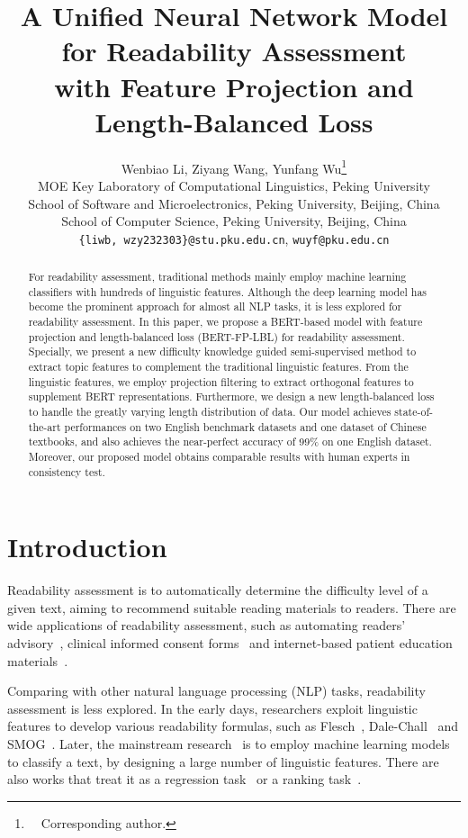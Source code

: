 \documentclass[11pt]{article}
\title{A Unified Neural Network Model for Readability Assessment \\
with Feature Projection and Length-Balanced Loss}
\author{Wenbiao Li,
        Ziyang Wang, 
        Yunfang Wu\thanks{~~Corresponding author.} \\
    MOE Key Laboratory of Computational Linguistics, Peking University \\ 
    School of Software and Microelectronics, Peking University, Beijing, China \\
    School of Computer Science, Peking University, Beijing, China \\
    \texttt{\{liwb, wzy232303\}@stu.pku.edu.cn},
    \texttt{wuyf@pku.edu.cn}
    }
\begin{document}
\maketitle
\begin{abstract}
For readability assessment, traditional methods mainly employ machine learning classifiers with hundreds of linguistic features. Although the deep learning model has become the prominent approach for almost all NLP tasks, it is less explored for readability assessment.
In this paper, we propose a BERT-based model with feature projection and length-balanced loss (BERT-FP-LBL) for readability assessment. Specially, we present a new difficulty knowledge guided semi-supervised method to extract topic features to complement the traditional linguistic features. 
From the linguistic features, we employ projection filtering to extract orthogonal features to supplement BERT representations.
Furthermore, we design a new length-balanced loss to handle the greatly varying length distribution of data.
Our model achieves state-of-the-art performances on two English benchmark datasets and one dataset of Chinese textbooks, and also achieves the
near-perfect accuracy of 99\% on one English dataset. Moreover, our proposed model obtains comparable results with human experts in consistency test.


\end{abstract}

\section{Introduction}
Readability assessment is to automatically determine the difficulty level of a given text, aiming to recommend suitable reading materials to readers.
There are wide applications of readability assessment, such as automating readers’ advisory~\cite{pera2014automating}, clinical informed consent forms~\cite{perni2019assessment} and internet-based patient education materials~\cite{sare2020readability}.


Comparing with other natural language processing (NLP) tasks, readability assessment is less explored.
In the early days, researchers exploit linguistic features to develop various readability formulas, such as Flesch~\cite{flesch1948new}, Dale-Chall~\cite{dale1948formula} and SMOG~\cite{mc1969smog}. 
Later, the mainstream research~\cite{deutsch2020linguistic,hansen2021machine,lee2021pushing} is to employ machine learning models to classify a text, by designing a large number of linguistic features.
There are also works that treat it as a regression task~\cite{sheehan2010generating} or a ranking task~\cite{lee2022neural}.
\end{document}
